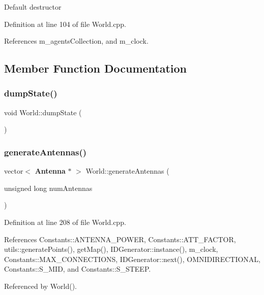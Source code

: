 Default destructor 

Definition at line 104 of file World.\+cpp.



References m\+\_\+agents\+Collection, and m\+\_\+clock.



\subsection{Member Function Documentation}
\mbox{\label{class_world_abb6faf5385d3960dca29ee9390460eea}} 
\subsubsection{dump\+State()}
{\footnotesize\ttfamily void World\+::dump\+State (\begin{DoxyParamCaption}{ }\end{DoxyParamCaption})}

\mbox{\label{class_world_a6cb3aa7d814b3d6302ea984889179eac}} 
\subsubsection{generate\+Antennas()}
{\footnotesize\ttfamily vector$<$ \textbf{ Antenna} $\ast$ $>$ World\+::generate\+Antennas (\begin{DoxyParamCaption}\item[{unsigned long}]{num\+Antennas }\end{DoxyParamCaption})\hspace{0.3cm}{\ttfamily [private]}}



Definition at line 208 of file World.\+cpp.



References Constants\+::\+A\+N\+T\+E\+N\+N\+A\+\_\+\+P\+O\+W\+ER, Constants\+::\+A\+T\+T\+\_\+\+F\+A\+C\+T\+OR, utils\+::generate\+Points(), get\+Map(), I\+D\+Generator\+::instance(), m\+\_\+clock, Constants\+::\+M\+A\+X\+\_\+\+C\+O\+N\+N\+E\+C\+T\+I\+O\+NS, I\+D\+Generator\+::next(), O\+M\+N\+I\+D\+I\+R\+E\+C\+T\+I\+O\+N\+AL, Constants\+::\+S\+\_\+\+M\+ID, and Constants\+::\+S\+\_\+\+S\+T\+E\+EP.



Referenced by World().

